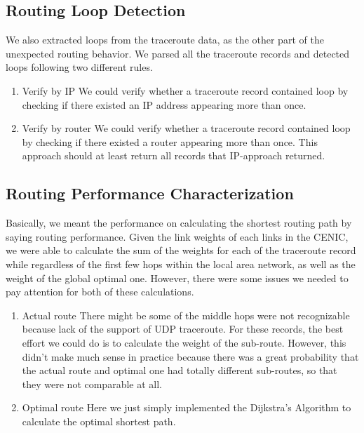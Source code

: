 \documentclass[conference, twocolumn, oneside, 10pt]{IEEEtran}
\begin{document}
\subsection{Routing Loop Detection}

We also extracted loops from the traceroute data, as the other part of the unexpected routing behavior. We parsed all the traceroute records and detected loops following two different rules. 
\begin{enumerate}
\item{Verify by IP} We could verify whether a traceroute record contained loop by checking if there existed an IP address appearing more than once. 
\item{Verify by router} We could verify whether a traceroute record contained loop by checking if there existed a router appearing more than once. This approach should at least return all records that IP-approach returned.
\end{enumerate}
\subsection{Routing Performance Characterization}

Basically, we meant the performance on calculating the shortest routing path by saying routing performance. Given the link weights of each links in the CENIC, we were able to calculate the sum of the weights for each of the traceroute record while regardless of the first few hops within the local area network, as well as the weight of the global optimal one. However, there were some issues we needed to pay attention for both of these calculations.

\begin{enumerate}

\item{Actual route} There might be some of the middle hops were not recognizable because lack of the support of UDP traceroute. For these records, the best effort we could do is to calculate the weight of the sub-route. However, this didn't make much sense in practice because there was a great probability that the actual route and optimal one had totally different sub-routes, so that they were not comparable at all.

\item{Optimal route} Here we just simply implemented the Dijkstra's Algorithm to calculate the optimal shortest path.

\end{enumerate}
\end{document}
